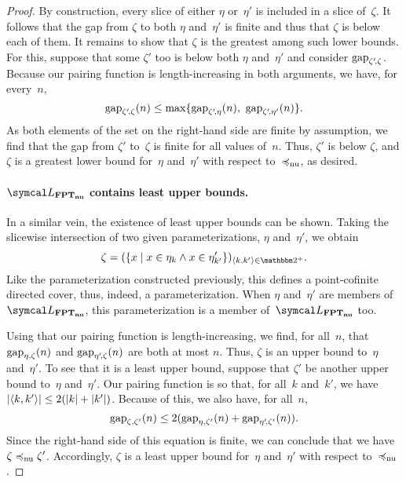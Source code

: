 \begin{proof}
  By construction, every slice of either $\eta$ or~$\eta'$ is included in a slice of~$\zeta$.
  It follows that the gap from $\zeta$ to both $\eta$ and~$\eta'$ is finite and thus that $\zeta$ is below each of them.
  It remains to show that $\zeta$ is the greatest among such lower bounds.
  For this, suppose that some $\zeta'$ too is below both $\eta$ and~$\eta'$ and consider $\operatorname{gap}_{\zeta'\!, \zeta}$.
  Because our pairing function is length-increasing in both arguments, we have, for every~$n$,
  \begin{equation*}
    \operatorname{gap}_{\zeta'\!, \zeta}(n) \le \max\{\operatorname{gap}_{\zeta'\!, \eta}(n),\ \operatorname{gap}_{\zeta'\!, \eta'}(n)\}.
  \end{equation*}
  As both elements of the set on the right-hand side are finite by assumption, we find that the gap from $\zeta'$ to~$\zeta$ is finite for all values of~$n$.
  Thus, $\zeta'$ is below $\zeta$, and $\zeta$ is a greatest lower bound for~$\eta$ and~$\eta'$ with respect to~$\preccurlyeq_\mathrm{nu}$, as desired.

  \paragraph{$\calL_\clnu{FPT}$ contains least upper bounds.}
  In a similar vein, the existence of least upper bounds can be shown.
  Taking the slicewise intersection of two given parameterizations, $\eta$ and~$\eta'$, we obtain
  \begin{equation*}
    \zeta \deq (\{x \st x \in \eta_k \land x \in \eta'_{k'}\})_{\pair{k}{k'} \in \binary^+}.
  \end{equation*}
  Like the parameterization constructed previously, this defines a point-cofinite directed cover, thus, indeed, a parameterization.
  When $\eta$ and~$\eta'$ are members of~$\calL_\clnu{FPT}$, this parameterization is a member of~$\calL_\clnu{FPT}$ too.

  Using that our pairing function is length-increasing, we find, for all~$n$, that $\operatorname{gap}_{\eta, \zeta}(n)$ and $\operatorname{gap}_{\eta'\!, \zeta}(n)$ are both at most $n$.
  Thus, $\zeta$ is an upper bound to~$\eta$ and~$\eta'$.
  To see that it is a least upper bound, suppose that $\zeta'$ be another upper bound to~$\eta$ and~$\eta'$.
  Our pairing function is so that, for all~$k$ and~$k'$, we have ${\lvert{\langle k, k'\rangle}\rvert} \le 2({\lvert k\rvert} + {\lvert k'\rvert})$.
  Because of this, we also have, for all~$n$,
  \begin{equation*}
    \operatorname{gap}_{\zeta, \zeta'}(n) \le 2(\operatorname{gap}_{\eta, \zeta'}(n) + \operatorname{gap}_{\eta'\!, \zeta'}(n)).
  \end{equation*}
  Since the right-hand side of this equation is finite, we can conclude that we have $\zeta \preccurlyeq_\mathrm{nu} \zeta'$.
  Accordingly, $\zeta$ is a least upper bound for~$\eta$ and~$\eta'$ with respect to~$\preccurlyeq_\mathrm{nu}$.


\end{proof}
